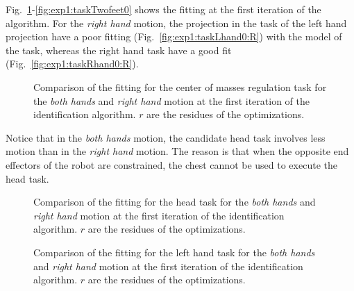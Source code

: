 \documentclass[letterpaper, 10pt, conference]{ieeeconf}      %
\begin{document}
Fig.~\ref{fig:exp1:taskCom0}-\ref{fig:exp1:taskTwofeet0} shows the
fitting at the first iteration of the algorithm. 
For the \emph{right hand} motion, the projection in the task of the left hand projection have a poor fitting
(Fig.~\ref{fig:exp1:taskLhand0:R}) with the model of the task, whereas the right hand task have a good
fit (Fig.~\ref{fig:exp1:taskRhand0:R}).


\begin{figure}[t]
  \centering
  \caption{Comparison of the fitting for the center of masses regulation task for the \emph{both hands} and \emph{right hand} motion at the first iteration of the identification algorithm.
  $r$ are the residues of the optimizations.}
  \label{fig:exp1:taskCom0}
\end{figure}

Notice that in the \emph{both hands} motion, the candidate head task involves less motion
than in the \emph{right hand} motion. The reason is that when the opposite end effectors
of the robot are constrained, the chest cannot be used to execute the head task.

\begin{figure}[t]
  \centering
  \caption{Comparison of the fitting for the head task for the
  \emph{both hands} and \emph{right hand} motion at the first
  iteration of the identification algorithm.  $r$ are
  the residues of the optimizations.}
  \label{fig:exp1:taskHead0}
\end{figure}

\begin{figure}[t]
  \centering
  \caption{Comparison of the fitting for the left hand task for the
  \emph{both hands} and \emph{right hand} motion at the first
  iteration of the identification algorithm.  $r$ are
  the residues of the optimizations.}
  \label{fig:exp1:taskLhand0}
\end{figure}
\end{document}
